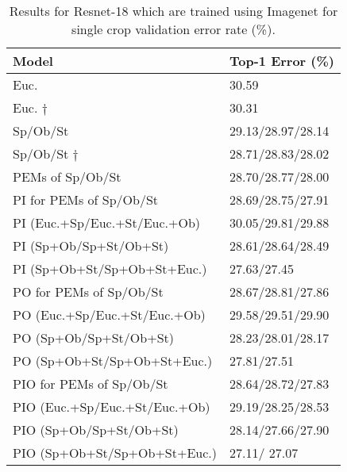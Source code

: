 \documentclass[10pt,journal,compsoc]{IEEEtran}
\theoremstyle{definition}
\theoremstyle{definition}
\theoremstyle{remark}
\theoremstyle{remark}
\theoremstyle{remark}
\begin{document}
\begin{table}[t]
	\centering
	\caption{Results for Resnet-18 which are trained using Imagenet for single crop validation error rate (\%).}		
	\begin{tabular}{C{4.85cm} C{2.70cm}}
		\toprule
		\toprule
		
		\textbf{Model} & \textbf{Top-1 Error (\%)} \\
		
		\midrule
		\midrule
		Euc. \cite{oo16} & 30.59\\
		Euc. $\dagger$ & {\color{red} 30.31}\\
		Sp/Ob/St\cite{oo16}  & 29.13/28.97/{{28.14}}\\
		Sp/Ob/St $\dagger$  & 28.71/28.83/{{28.02}}\\	
		PEMs of Sp/Ob/St & 28.70/28.77/{{28.00}}\\	
PI for PEMs of Sp/Ob/St & 28.69/28.75/{{27.91}}\\				
		PI (Euc.+Sp/Euc.+St/Euc.+Ob) & 30.05/29.81/29.88  \\		
		PI (Sp+Ob/Sp+St/Ob+St) & 28.61/28.64/28.49  \\
		PI (Sp+Ob+St/Sp+Ob+St+Euc.)  & 27.63/27.45  \\	
PO for PEMs of Sp/Ob/St & 28.67/28.81/{{27.86}}\\						
		PO (Euc.+Sp/Euc.+St/Euc.+Ob) & 29.58/29.51/29.90  \\		
		PO (Sp+Ob/Sp+St/Ob+St) & 28.23/28.01/28.17  \\
		PO (Sp+Ob+St/Sp+Ob+St+Euc.)  & 27.81/27.51  \\
PIO for PEMs of Sp/Ob/St & 28.64/28.72/{{27.83}}\\								
		PIO (Euc.+Sp/Euc.+St/Euc.+Ob) & 29.19/28.25/28.53  \\		
PIO (Sp+Ob/Sp+St/Ob+St) & 28.14/27.66/27.90  \\
PIO (Sp+Ob+St/Sp+Ob+St+Euc.)  & 27.11/{\color{blue} 27.07}  \\			
		\bottomrule
		\bottomrule
	\end{tabular}%
	\label{tab:imagenet}%
\end{table}%
\end{document}
